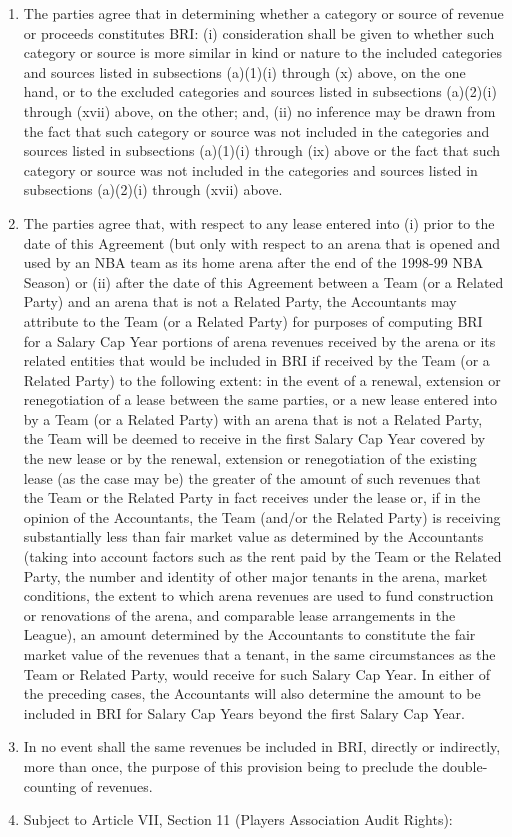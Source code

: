\documentclass[
]{book}
\begin{document}
\begin{enumerate}
\begin{enumerate}
\begin{enumerate}
    \end{enumerate}
  \item
    The parties agree that in determining whether a category or source of revenue or proceeds constitutes BRI: (i) consideration shall be given to whether such category or source is more similar in kind or nature to the included categories and sources listed in subsections (a)(1)(i) through (x) above, on the one hand, or to the excluded categories and sources listed in subsections (a)(2)(i) through (xvii) above, on the other; and, (ii) no inference may be drawn from the fact that such category or source was not included in the categories and sources listed in subsections (a)(1)(i) through (ix) above or the fact that such category or source was not included in the categories and sources listed in subsections (a)(2)(i) through (xvii) above.
  \item
    The parties agree that, with respect to any lease entered into (i) prior to the date of this Agreement (but only with respect to an arena that is opened and used by an NBA team as its home arena after the end of the 1998-99 NBA Season) or (ii) after the date of this Agreement between a Team (or a Related Party) and an arena that is not a Related Party, the Accountants may attribute to the Team (or a Related Party) for purposes of computing BRI for a Salary Cap Year portions of arena revenues received by the arena or its related entities that would be included in BRI if received by the Team (or a Related Party) to the following extent: in the event of a renewal, extension or renegotiation of a lease between the same parties, or a new lease entered into by a Team (or a Related Party) with an arena that is not a Related Party, the Team will be deemed to receive in the first Salary Cap Year covered by the new lease or by the renewal, extension or renegotiation of the existing lease (as the case may be) the greater of the amount of such revenues that the Team or the Related Party in fact receives under the lease or, if in the opinion of the Accountants, the Team (and/or the Related Party) is receiving substantially less than fair market value as determined by the Accountants (taking into account factors such as the rent paid by the Team or the Related Party, the number and identity of other major tenants in the arena, market conditions, the extent to which arena revenues are used to fund construction or renovations of the arena, and comparable lease arrangements in the League), an amount determined by the Accountants to constitute the fair market value of the revenues that a tenant, in the same circumstances as the Team or Related Party, would receive for such Salary Cap Year. In either of the preceding cases, the Accountants will also determine the amount to be included in BRI for Salary Cap Years beyond the first Salary Cap Year.
  \item
    In no event shall the same revenues be included in BRI, directly or indirectly, more than once, the purpose of this provision being to preclude the double-counting of revenues.
  \item
    Subject to Article VII, Section 11 (Players Association Audit Rights):


\end{enumerate}
\end{enumerate}
\end{document}
